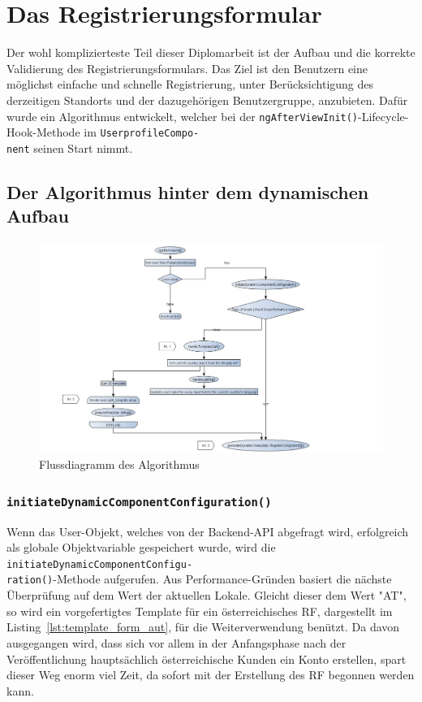 \chapter{Das Registrierungsformular}

Der wohl komplizierteste Teil dieser Diplomarbeit ist der Aufbau und die korrekte Validierung des Registrierungsformulars. Das Ziel ist den Benutzern eine möglichst einfache und schnelle Registrierung, unter Berücksichtigung des derzeitigen Standorts und der dazugehörigen Benutzergruppe, anzubieten. Dafür wurde ein Algorithmus entwickelt, welcher bei der \texttt{ngAfterViewInit()}-Lifecycle-Hook-Methode im \texttt{UserprofileCompo-\\nent} seinen Start nimmt.

\section{Der Algorithmus hinter dem dynamischen Aufbau}

\begin{figure}[H]
	\centerline{
		\includegraphics[width=1\textwidth, frame]{./grafiken/RF_Flussdiagramm_2.png}
	}
	\vskip0pt
	\caption{Flussdiagramm des Algorithmus}
	\label{fig:fc}
\end{figure}
\newpage
\subsection{\texttt{initiateDynamicComponentConfiguration()}} \label{ssec:lblInitDCC}

Wenn das User-Objekt, welches von der Backend-API abgefragt wird, erfolgreich als globale Objektvariable gespeichert wurde, wird die \texttt{initiateDynamicComponentConfigu-\\ration()}-Methode aufgerufen. Aus Performance-Gründen basiert die nächste Überprüfung auf dem Wert der aktuellen Lokale. Gleicht dieser dem Wert "AT", so wird ein vorgefertigtes Template für ein österreichisches RF, dargestellt im Listing~\ref{lst:template_form_aut}, für die Weiterverwendung benützt. Da davon ausgegangen wird, dass sich vor allem in der Anfangsphase nach der Veröffentlichung hauptsächlich österreichische Kunden ein Konto erstellen, spart dieser Weg enorm viel Zeit, da sofort mit der Erstellung des RF begonnen werden kann.

